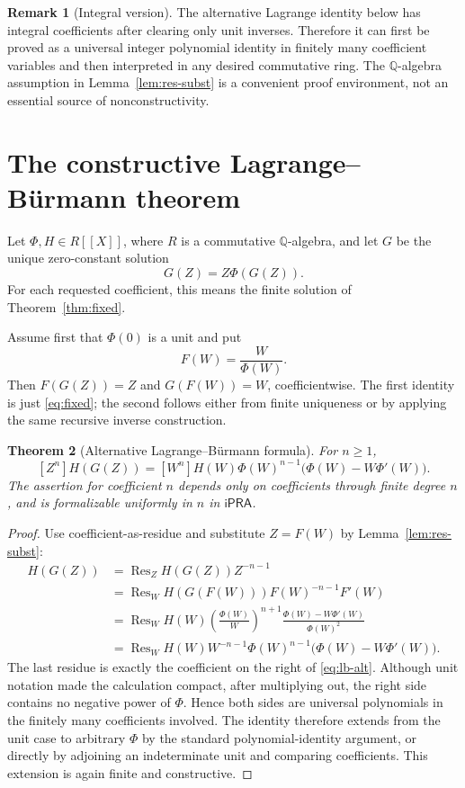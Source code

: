 \documentclass[11pt]{article}
\newtheorem{theorem}{Theorem}[section]
\theoremstyle{definition}
\newtheorem{remark}[theorem]{Remark}
\newcommand{\Q}{\mathbb Q}
\newcommand{\ipra}{\mathsf{iPRA}}
\newcommand{\fps}[1]{#1[\![X]\!]}
\newcommand{\Res}{\operatorname{Res}}
\begin{document}
\begin{remark}[Integral version]
The alternative Lagrange identity below has integral coefficients after
clearing only unit inverses.  Therefore it can first be proved as a universal
integer polynomial identity in finitely many coefficient variables and then
interpreted in any desired commutative ring.  The \(\Q\)-algebra assumption in
Lemma~\ref{lem:res-subst} is a convenient proof environment, not an essential
source of nonconstructivity.
\end{remark}

\section{The constructive Lagrange--B\"urmann theorem}\label{sec:main}

Let \(\Phi,H\in\fps{R}\), where \(R\) is a commutative \(\Q\)-algebra, and
let \(G\) be the unique zero-constant solution
\begin{equation}\label{eq:fixed}
 G(Z)=Z\Phi(G(Z)).
\end{equation}
For each requested coefficient, this means the finite solution of
Theorem~\ref{thm:fixed}.

Assume first that \(\Phi(0)\) is a unit and put
\[
 F(W)=\frac{W}{\Phi(W)}.
\]
Then \(F(G(Z))=Z\) and \(G(F(W))=W\), coefficientwise.  The first identity is
just \eqref{eq:fixed}; the second follows either from finite uniqueness or by
applying the same recursive inverse construction.

\begin{theorem}[Alternative Lagrange--B\"urmann formula]\label{thm:lb-alt}
For \(n\ge1\),
\begin{equation}\label{eq:lb-alt}
 [Z^n]H(G(Z))
 = [W^n]H(W)\Phi(W)^{n-1}
       \bigl(\Phi(W)-W\Phi'(W)\bigr).
\end{equation}
The assertion for coefficient \(n\) depends only on coefficients through
finite degree \(n\), and is formalizable uniformly in \(n\) in \(\ipra\).
\end{theorem}
\begin{proof}
Use coefficient-as-residue and substitute \(Z=F(W)\) by
Lemma~\ref{lem:res-subst}:
\begin{align*}
 [Z^n]H(G(Z))
 &=\Res_Z H(G(Z))Z^{-n-1}\\
 &=\Res_W H(G(F(W)))F(W)^{-n-1}F'(W)\\
 &=\Res_W H(W)
   \left(\frac{\Phi(W)}{W}\right)^{n+1}
   \frac{\Phi(W)-W\Phi'(W)}{\Phi(W)^2}\\
 &=\Res_W H(W)W^{-n-1}\Phi(W)^{n-1}
       \bigl(\Phi(W)-W\Phi'(W)\bigr).
\end{align*}
The last residue is exactly the coefficient on the right of
\eqref{eq:lb-alt}.  Although unit notation made the calculation compact, after
multiplying out, the right side contains no negative power of \(\Phi\).  Hence
both sides are universal polynomials in the finitely many coefficients involved.
The identity therefore extends from the unit case to arbitrary \(\Phi\) by the
standard polynomial-identity argument, or directly by adjoining an
indeterminate unit and comparing coefficients.  This extension is again
finite and constructive.
\end{proof}
\end{document}
